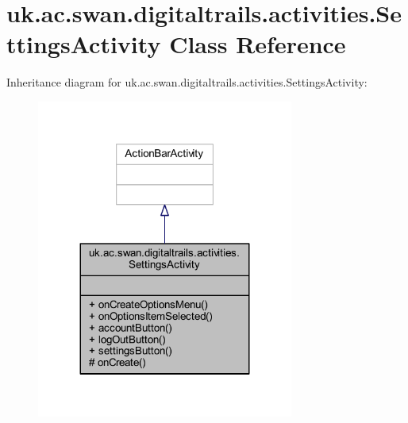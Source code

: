\hypertarget{classuk_1_1ac_1_1swan_1_1digitaltrails_1_1activities_1_1_settings_activity}{\section{uk.\+ac.\+swan.\+digitaltrails.\+activities.\+Settings\+Activity Class Reference}
\label{classuk_1_1ac_1_1swan_1_1digitaltrails_1_1activities_1_1_settings_activity}
}


Inheritance diagram for uk.\+ac.\+swan.\+digitaltrails.\+activities.\+Settings\+Activity\+:
\nopagebreak
\begin{figure}[H]
\begin{center}
\leavevmode
\includegraphics[width=239pt]{classuk_1_1ac_1_1swan_1_1digitaltrails_1_1activities_1_1_settings_activity__inherit__graph}
\end{center}
\end{figure}


